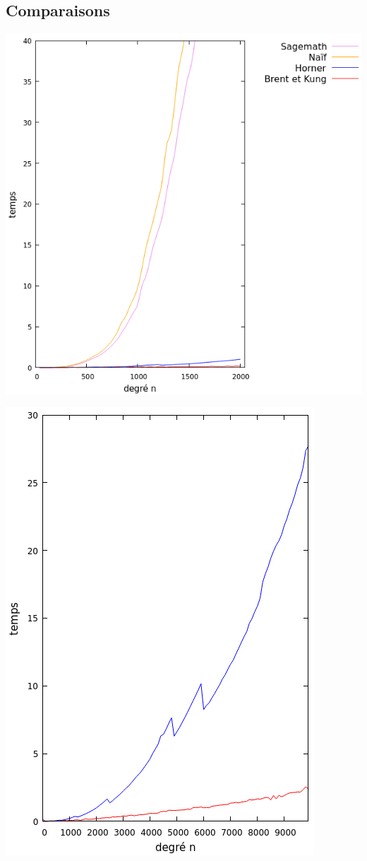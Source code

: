 \documentclass[a4paper]{article}
\begin{document}
\newpage

\subsection{Comparaisons}
\begin{multicols}{2}
    \includegraphics[scale=0.4, center]{comp.png}
    \columnbreak

    \includegraphics[scale=0.4, center]{comp_2.png}
\end{multicols}
\end{document}
